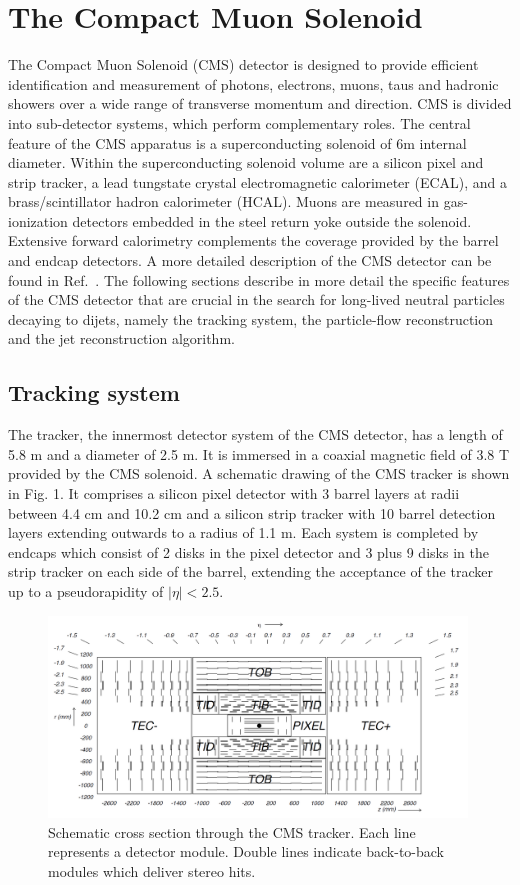 \section{The Compact Muon Solenoid}

The Compact Muon Solenoid (CMS) detector is designed to provide efficient identification and 
measurement of photons, electrons, muons, taus and hadronic showers over a wide range of 
transverse momentum and direction.
CMS is divided into sub-detector systems, which perform complementary roles.
The central feature of the CMS apparatus is a superconducting solenoid of 6\unit{m} internal diameter. Within the superconducting solenoid volume are a silicon pixel and strip tracker, a lead tungstate crystal electromagnetic calorimeter (ECAL), and a brass/scintillator hadron calorimeter (HCAL). Muons are measured in gas-ionization detectors embedded in the steel return yoke outside the solenoid. Extensive forward calorimetry complements the coverage provided by the barrel and endcap detectors. 
A more detailed description of the CMS detector can be found in Ref.~\cite{Chatrchyan:2008zzk}.  
The following sections describe in more detail the specific features of the CMS detector
that are crucial in the search for long-lived neutral particles decaying to dijets, namely the
tracking system, the particle-flow reconstruction and the jet reconstruction algorithm.

\subsection{Tracking system}

The tracker, the innermost detector system of the CMS detector, has a length
of 5.8 m and a
diameter of 2.5 m. It is immersed in a coaxial magnetic field of 3.8 T
provided by the CMS solenoid. A schematic drawing of the CMS tracker is shown in
Fig. 1. It comprises a silicon pixel detector with 3 barrel layers at radii
between 4.4 cm and 10.2 cm and a silicon strip tracker with 10 barrel
detection layers extending outwards to a radius of 1.1 m. Each system is
completed by endcaps which consist of 2 disks in the pixel detector and 3
plus 9 disks in the strip tracker on each side of the barrel, extending
the acceptance of the tracker up to a pseudorapidity of $|\eta| < 2.5$.
\begin{figure}[!h]
\centering
\includegraphics[width=0.99\textwidth]{plots/intro/tracker.png}
\caption{Schematic cross section through the CMS tracker. Each line represents a
detector module. Double lines indicate back-to-back modules which deliver stereo
hits.}
\end{figure}


